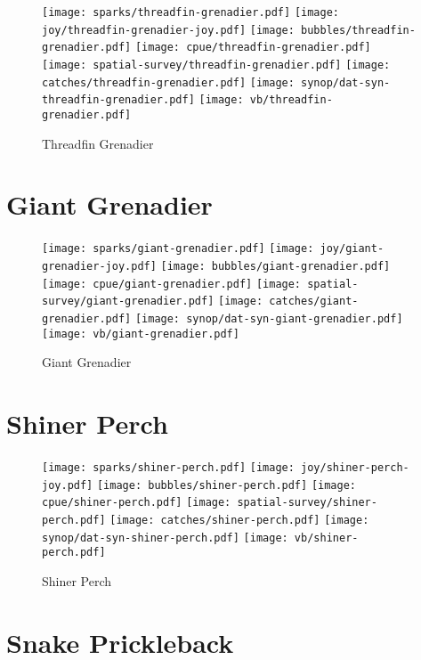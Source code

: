 \begin{figure}[htbp]
\centering
\texttt{[image: sparks/threadfin-grenadier.pdf]}
\texttt{[image: joy/threadfin-grenadier-joy.pdf]}
\texttt{[image: bubbles/threadfin-grenadier.pdf]}
\texttt{[image: cpue/threadfin-grenadier.pdf]}
\texttt{[image: spatial-survey/threadfin-grenadier.pdf]}
\texttt{[image: catches/threadfin-grenadier.pdf]}
\texttt{[image: synop/dat-syn-threadfin-grenadier.pdf]}
\texttt{[image: vb/threadfin-grenadier.pdf]}
\caption{Threadfin Grenadier}
\end{figure}
\clearpage
\section{Giant Grenadier}

\begin{figure}[htbp]
\centering
\texttt{[image: sparks/giant-grenadier.pdf]}
\texttt{[image: joy/giant-grenadier-joy.pdf]}
\texttt{[image: bubbles/giant-grenadier.pdf]}
\texttt{[image: cpue/giant-grenadier.pdf]}
\texttt{[image: spatial-survey/giant-grenadier.pdf]}
\texttt{[image: catches/giant-grenadier.pdf]}
\texttt{[image: synop/dat-syn-giant-grenadier.pdf]}
\texttt{[image: vb/giant-grenadier.pdf]}
\caption{Giant Grenadier}
\end{figure}
\clearpage
\section{Shiner Perch}

\begin{figure}[htbp]
\centering
\texttt{[image: sparks/shiner-perch.pdf]}
\texttt{[image: joy/shiner-perch-joy.pdf]}
\texttt{[image: bubbles/shiner-perch.pdf]}
\texttt{[image: cpue/shiner-perch.pdf]}
\texttt{[image: spatial-survey/shiner-perch.pdf]}
\texttt{[image: catches/shiner-perch.pdf]}
\texttt{[image: synop/dat-syn-shiner-perch.pdf]}
\texttt{[image: vb/shiner-perch.pdf]}
\caption{Shiner Perch}
\end{figure}
\clearpage
\section{Snake Prickleback}

